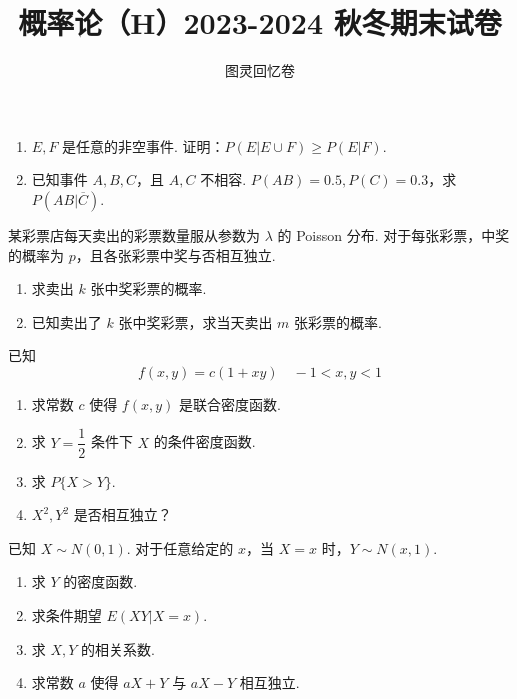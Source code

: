 \documentclass{ctexart}
\title{\vspace{-4em}\textbf{概率论（H）2023-2024 秋冬期末试卷}}
\author{图灵回忆卷}
\date{\zhtoday}
\begin{document}
\maketitle

\begin{enumerate}
    \item $E,F$ 是任意的非空事件. 证明：$ P(E | E \cup F) \geqslant P(E | F) $.

    \item 已知事件 $A, B, C$，且 $A, C$ 不相容. $P(AB) = 0.5, P(C) = 0.3$，求 $P(AB|\overline{C})$.
\end{enumerate}

某彩票店每天卖出的彩票数量服从参数为 $\lambda$ 的 Poisson 分布. 对于每张彩票，中奖的概率为 $p$，且各张彩票中奖与否相互独立.
\begin{enumerate}
    \item 求卖出 $k$ 张中奖彩票的概率.

    \item 已知卖出了 $k$ 张中奖彩票，求当天卖出 $m$ 张彩票的概率.
\end{enumerate}

已知
\[ f(x,y) = c(1+xy) \quad -1 < x, y < 1 \]

\begin{enumerate}
    \item 求常数 $c$ 使得 $f(x,y)$ 是联合密度函数.

    \item 求 $Y = \dfrac{1}{2}$ 条件下 $X$ 的条件密度函数.

    \item 求 $P\{X > Y\}$.

    \item $X^2, Y^2$ 是否相互独立？
\end{enumerate}

已知 $X \sim N(0, 1)$. 对于任意给定的 $x$，当 $X = x$ 时，$Y \sim N(x, 1)$.
\begin{enumerate}
    \item 求 $Y$ 的密度函数.

    \item 求条件期望 $E(XY|X = x)$.

    \item 求 $X, Y$ 的相关系数.

    \item 求常数 $a$ 使得 $aX+Y$ 与 $aX-Y$ 相互独立.
\end{enumerate}
\end{document}

